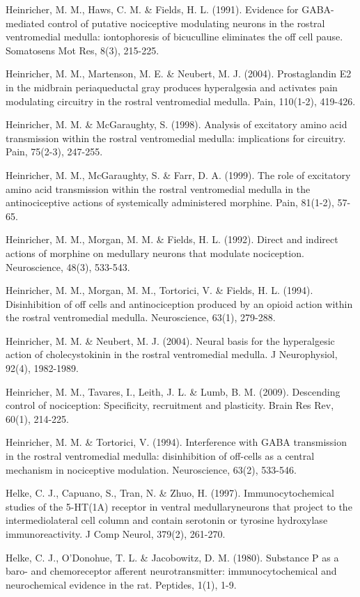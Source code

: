 \documentclass[a4paper,12pt,twoside]{report}
\begin{document}
\begin{singlespacing}
\begin{footnotesize}
Heinricher, M. M., Haws, C. M. \& Fields, H. L. (1991). Evidence for GABA-mediated control of putative nociceptive modulating neurons in the rostral ventromedial medulla: iontophoresis of bicuculline eliminates the off cell pause. Somatosens Mot Res, 8(3), 215-225.

Heinricher, M. M., Martenson, M. E. \& Neubert, M. J. (2004). Prostaglandin E2 in the midbrain periaqueductal gray produces hyperalgesia and activates pain modulating circuitry in the rostral ventromedial medulla. Pain, 110(1-2), 419-426.

Heinricher, M. M. \& McGaraughty, S. (1998). Analysis of excitatory amino acid transmission within the rostral ventromedial medulla: implications for circuitry. Pain, 75(2-3), 247-255.

Heinricher, M. M., McGaraughty, S. \& Farr, D. A. (1999). The role of excitatory amino acid transmission within the rostral ventromedial medulla in the antinociceptive actions of systemically administered morphine. Pain, 81(1-2), 57-65.

Heinricher, M. M., Morgan, M. M. \& Fields, H. L. (1992). Direct and indirect actions of morphine on medullary neurons that modulate nociception. Neuroscience, 48(3), 533-543.

Heinricher, M. M., Morgan, M. M., Tortorici, V. \& Fields, H. L. (1994). Disinhibition of off cells and antinociception produced by an opioid action within the rostral ventromedial medulla. Neuroscience, 63(1), 279-288.

Heinricher, M. M. \& Neubert, M. J. (2004). Neural basis for the hyperalgesic action of cholecystokinin in the rostral ventromedial medulla. J Neurophysiol, 92(4), 1982-1989.

Heinricher, M. M., Tavares, I., Leith, J. L. \& Lumb, B. M. (2009). Descending control of nociception: Specificity, recruitment and plasticity. Brain Res Rev, 60(1), 214-225.

Heinricher, M. M. \& Tortorici, V. (1994). Interference with GABA transmission in the rostral ventromedial medulla: disinhibition of off-cells as a central mechanism in nociceptive modulation. Neuroscience, 63(2), 533-546.

Helke, C. J., Capuano, S., Tran, N. \& Zhuo, H. (1997). Immunocytochemical studies of the 5-HT(1A) receptor in ventral medullaryneurons that project to the intermediolateral cell column and contain serotonin or tyrosine hydroxylase immunoreactivity. J Comp Neurol, 379(2), 261-270.

Helke, C. J., O'Donohue, T. L. \& Jacobowitz, D. M. (1980). Substance P as a baro- and chemoreceptor afferent neurotransmitter: immunocytochemical and neurochemical evidence in the rat. Peptides, 1(1), 1-9.


\end{footnotesize}
\end{singlespacing}
\end{document}
